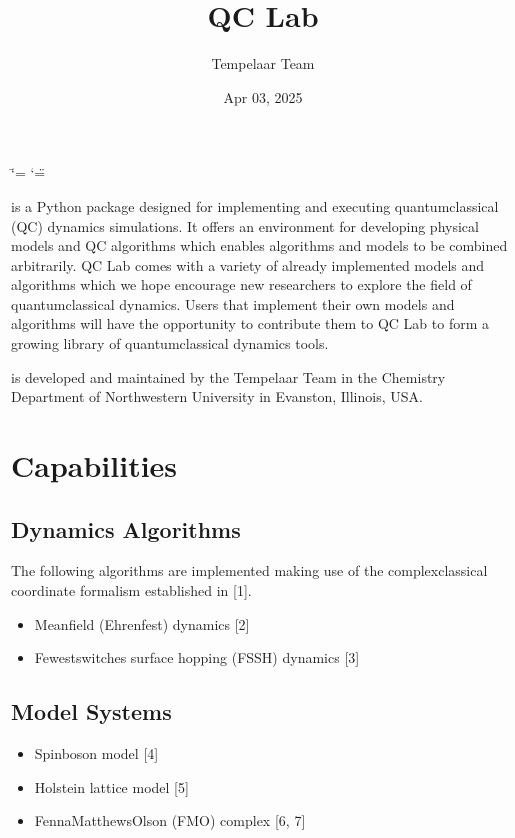 \documentclass[letterpaper,10pt,english]{sphinxmanual}
\title{QC Lab}
\date{Apr 03, 2025}
\author{Tempelaar Team}
\begin{document}
\ifdefined\shorthandoff
  \ifnum\catcode`\=\string=\active\shorthandoff{=}\fi
  \ifnum\catcode`\"=\active{}\fi
\fi

\pagestyle{empty}
\sphinxmaketitle
\pagestyle{plain}
\sphinxtableofcontents
\pagestyle{normal}
\label{\detokenize{index::doc}}


\sphinxAtStartPar
{} is a Python package designed for implementing and executing quantum\sphinxhyphen{}classical (QC) dynamics simulations.
It offers an environment for developing physical models and QC algorithms which enables algorithms and models to be combined arbitrarily.
QC Lab comes with a variety of already implemented models and algorithms which we hope encourage new researchers to explore the field of quantum\sphinxhyphen{}classical dynamics. Users that implement their own models and algorithms will have the opportunity to contribute them to QC Lab to form a
growing library of quantum\sphinxhyphen{}classical dynamics tools.

\sphinxAtStartPar
{} is developed and maintained by the Tempelaar Team in the Chemistry Department of Northwestern University in Evanston, Illinois, USA.


\chapter{Capabilities}
\label{\detokenize{index:capabilities}}

\section{Dynamics Algorithms}
\label{\detokenize{index:dynamics-algorithms}}
\sphinxAtStartPar
The following algorithms are implemented making use of the complex\sphinxhyphen{}classical coordinate formalism established in {[}1{]}.
\begin{itemize}
\item {} 
\sphinxAtStartPar
Mean\sphinxhyphen{}field (Ehrenfest) dynamics {[}2{]}

\item {} 
\sphinxAtStartPar
Fewest\sphinxhyphen{}switches surface hopping (FSSH) dynamics {[}3{]}

\end{itemize}


\section{Model Systems}
\label{\detokenize{index:model-systems}}\begin{itemize}
\item {} 
\sphinxAtStartPar
Spin\sphinxhyphen{}boson model {[}4{]}

\item {} 
\sphinxAtStartPar
Holstein lattice model {[}5{]}

\item {} 
\sphinxAtStartPar
Fenna\sphinxhyphen{}Matthews\sphinxhyphen{}Olson (FMO) complex {[}6, 7{]}

\end{itemize}
\end{document}
